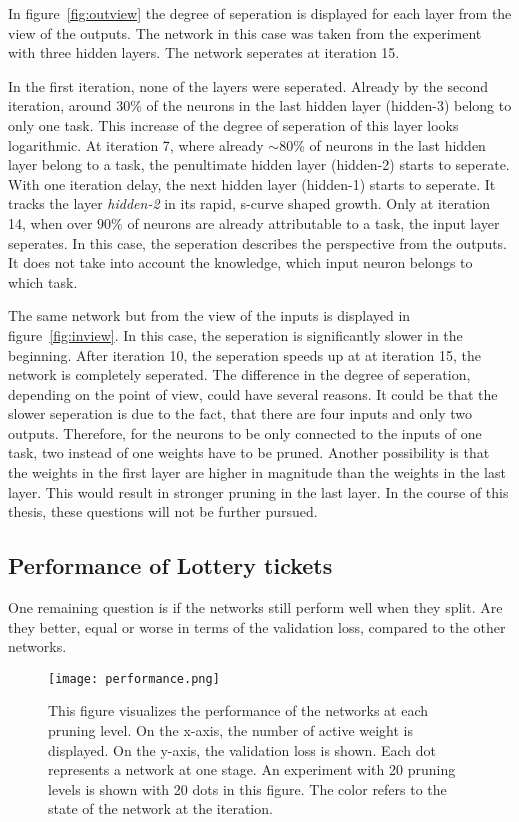 In figure~\ref{fig:outview} the degree of seperation is displayed for each layer from the view of the outputs.
The network in this case was taken from the experiment with three hidden layers.
The network seperates at iteration 15.

In the first iteration, none of the layers were seperated.
Already by the second iteration, around $30$\% of the neurons in the last hidden layer (hidden-3) belong to only one task.
This increase of the degree of seperation of this layer looks logarithmic.
At iteration 7, where already $\sim80$\% of neurons in the last hidden layer belong to a task, the penultimate hidden layer (hidden-2) starts to seperate.
With one iteration delay, the next hidden layer (hidden-1) starts to seperate.
It tracks the layer \textit{hidden-2} in its rapid, s-curve shaped growth.
Only at iteration 14, when over $90$\% of neurons are already attributable to a task, the input layer seperates.
In this case, the seperation describes the perspective from the outputs.
It does not take into account the knowledge, which input neuron belongs to which task.

The same network but from the view of the inputs is displayed in figure~\ref{fig:inview}.
In this case, the seperation is significantly slower in the beginning.
After iteration 10, the seperation speeds up at at iteration 15, the network is completely seperated.
The difference in the degree of seperation, depending on the point of view, could have several reasons.
It could be that the slower seperation is due to the fact, that there are four inputs and only two outputs.
Therefore, for the neurons to be only connected to the inputs of one task, two instead of one weights have to be pruned.
Another possibility is that the weights in the first layer are higher in magnitude than the weights in the last layer.
This would result in stronger pruning in the last layer.
In the course of this thesis, these questions will not be further pursued.



\subsection{Performance of Lottery tickets}
One remaining question is if the networks still perform well when they split.
Are they better, equal or worse in terms of the validation loss, compared to the other networks.

\begin{figure}[ht]
    \centering
    \texttt{[image: performance.png]}
    \caption{
        This figure visualizes the performance of the networks at each pruning level.
        On the x-axis, the number of active weight is displayed.
        On the y-axis, the validation loss is shown.
        Each dot represents a network at one stage.
        An experiment with 20 pruning levels is shown with 20 dots in this figure.
        The color refers to the state of the network at the iteration.
    }\label{fig:performance}
\end{figure}

